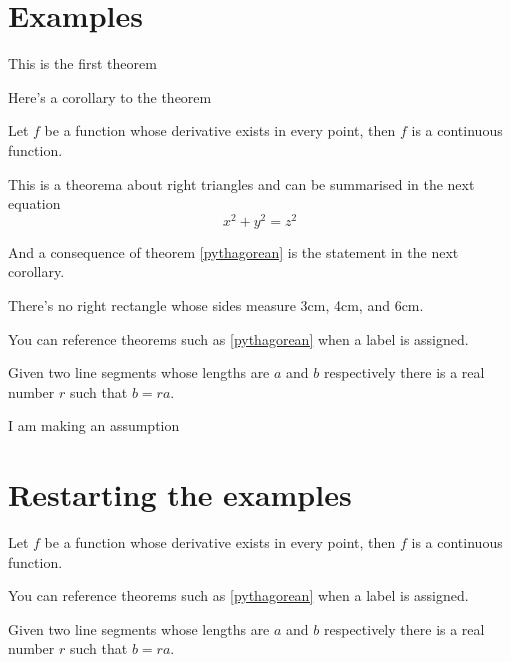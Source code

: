 \section{Examples}

\begin{theorem}
This is the first theorem
\end{theorem}

\begin{corollary}
Here's a corollary to the theorem
\end{corollary}




\begin{theorem}
Let $f$ be a function whose derivative exists in every point, then $f$ is 
a continuous function.
\end{theorem}

\begin{theorem}
\label{pythagorean}
This is a theorema about right triangles and can be summarised in the next 
equation 
\[ x^2 + y^2 = z^2 \]
\end{theorem}

And a consequence of theorem \ref{pythagorean} is the statement in the next 
corollary.

\begin{corollary}
There's no right rectangle whose sides measure 3cm, 4cm, and 6cm.
\end{corollary}

You can reference theorems such as \ref{pythagorean} when a label is assigned.

\begin{lemma}
Given two line segments whose lengths are $a$ and $b$ respectively there is a 
real number $r$ such that $b=ra$.
\end{lemma}

\begin{assumption}
I am making an assumption
\end{assumption}

\section{Restarting the examples}

\begin{theorem}
Let $f$ be a function whose derivative exists in every point, then $f$ is 
a continuous function.
\end{theorem}

You can reference theorems such as \ref{pythagorean} when a label is assigned.

\begin{lemma}
Given two line segments whose lengths are $a$ and $b$ respectively there is a 
real number $r$ such that $b=ra$.
\end{lemma}